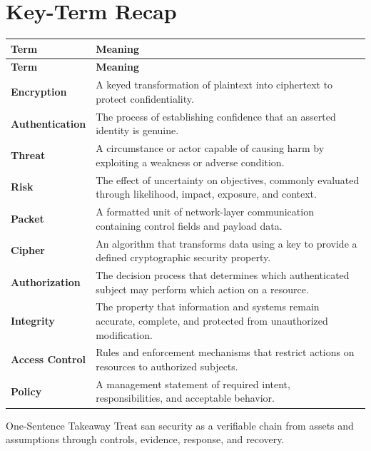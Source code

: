 \documentclass[11pt,letterpaper]{article}
\begin{document}
\section*{Key-Term Recap}
\begin{longtable}{>{\raggedright\arraybackslash}p{}>{\raggedright\arraybackslash}p{}}
\toprule\rowcolor{Navy}\color{white}\textbf{Term} & \color{white}\textbf{Meaning}\\\midrule
\endfirsthead
\toprule\rowcolor{Navy}\color{white}\textbf{Term} & \color{white}\textbf{Meaning}\\\midrule
\endhead
\textbf{Encryption} & A keyed transformation of plaintext into ciphertext to protect confidentiality. \\\midrule
\textbf{Authentication} & The process of establishing confidence that an asserted identity is genuine. \\\midrule
\textbf{Threat} & A circumstance or actor capable of causing harm by exploiting a weakness or adverse condition. \\\midrule
\textbf{Risk} & The effect of uncertainty on objectives, commonly evaluated through likelihood, impact, exposure, and context. \\\midrule
\textbf{Packet} & A formatted unit of network-layer communication containing control fields and payload data. \\\midrule
\textbf{Cipher} & An algorithm that transforms data using a key to provide a defined cryptographic security property. \\\midrule
\textbf{Authorization} & The decision process that determines which authenticated subject may perform which action on a resource. \\\midrule
\textbf{Integrity} & The property that information and systems remain accurate, complete, and protected from unauthorized modification. \\\midrule
\textbf{Access Control} & Rules and enforcement mechanisms that restrict actions on resources to authorized subjects. \\\midrule
\textbf{Policy} & A management statement of required intent, responsibilities, and acceptable behavior. \\\midrule
\bottomrule
\end{longtable}
\begin{CornellExamBox}{One-Sentence Takeaway}
Treat san security as a verifiable chain from assets and assumptions through controls, evidence, response, and recovery.
\end{CornellExamBox}
\end{document}
